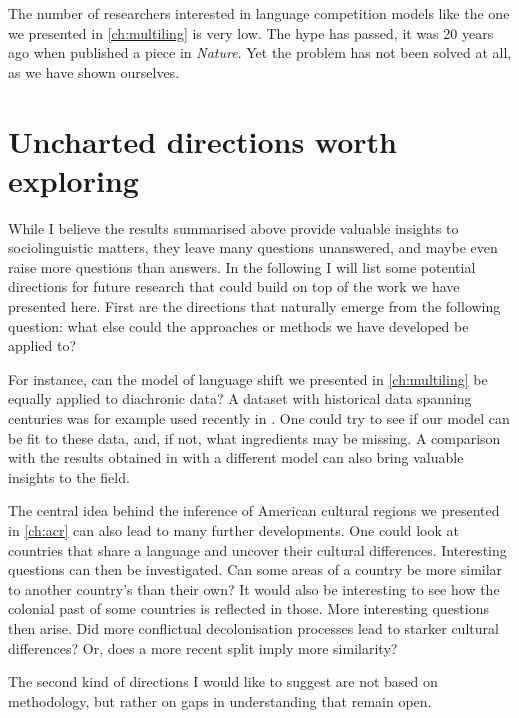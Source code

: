 \documentclass[../thesis.tex]{subfiles}
\begin{document}
The number of researchers interested in language competition models like the one we
presented in \cref{ch:multiling} is very low. The hype has passed, it was 20 years ago
when \citeauthor{AbramsModellingDynamics2003} published a piece in \textit{Nature}. Yet
the problem has not been solved at all, as we have shown ourselves. 



\section{Uncharted directions worth exploring}
While I believe the results summarised above provide valuable insights to
sociolinguistic matters, they leave many questions unanswered, and maybe even raise more
questions than answers. In the following I will list some potential directions for
future research that could build on top of the work we have presented here. First are
the directions that naturally emerge from the following question: what else could the
approaches or methods we have developed be applied to?

For instance, can the model of language shift we presented in \cref{ch:multiling} be
equally applied to diachronic data? A dataset with historical data spanning centuries
was for example used recently in \cite{SeoaneAreDutch2022}. One could try to see if our
model can be fit to these data, and, if not, what ingredients may be missing. A
comparison with the results obtained in \cite{SeoaneAreDutch2022} with a different model
can also bring valuable insights to the field. 

The central idea behind the inference of American cultural regions we presented in
\cref{ch:acr} can also lead to many further developments. One could look at countries
that share a language and uncover their cultural differences. Interesting questions can
then be investigated. Can some areas of a country be more similar to another country's
than their own? It would also be interesting to see how the colonial past of some
countries is reflected in those. More interesting questions then arise. Did more
conflictual decolonisation processes lead to starker cultural differences? Or, does a
more recent split imply more similarity?

The second kind of directions I would like to suggest are not based on methodology, but
rather on gaps in understanding that remain open.
\end{document}
